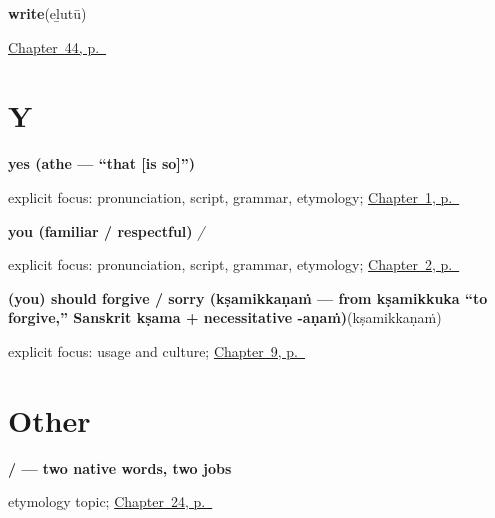 \noindent\begin{minipage}[t]{\linewidth}
\raggedright
\textbf{write}\enspace\emph{}\enspace(eḻutū)\par
\footnotesize \hyperref[ch:ml-see-say]{Chapter~44, p.~\pageref*{ch:ml-see-say}}
\end{minipage}\par\smallskip

\section*{Y}

\noindent\begin{minipage}[t]{\linewidth}
\raggedright
\textbf{yes (athe — \textquotedblleft{}that {[}is so{]}\textquotedblright{})}\enspace\emph{}\par
\footnotesize explicit focus: pronunciation, script, grammar, etymology; \hyperref[ch:greetings]{Chapter~1, p.~\pageref*{ch:greetings}}
\end{minipage}\par\smallskip

\noindent\begin{minipage}[t]{\linewidth}
\raggedright
\textbf{you (familiar / respectful)}\enspace\emph{ / }\par
\footnotesize explicit focus: pronunciation, script, grammar, etymology; \hyperref[ch:introductions]{Chapter~2, p.~\pageref*{ch:introductions}}
\end{minipage}\par\smallskip

\noindent\begin{minipage}[t]{\linewidth}
\raggedright
\textbf{(you) should forgive / sorry (kṣamikkaṇaṁ — from kṣamikkuka \textquotedblleft{}to forgive,\textquotedblright{} Sanskrit kṣama + necessitative -aṇaṁ)}\enspace\emph{}\enspace(kṣamikkaṇaṁ)\par
\footnotesize explicit focus: usage and culture; \hyperref[ch:ml-sorry]{Chapter~9, p.~\pageref*{ch:ml-sorry}}
\end{minipage}\par\smallskip

\section*{Other}

\noindent\begin{minipage}[t]{\linewidth}
\raggedright
\textbf{ /  — two native words, two jobs}\par
\footnotesize etymology topic; \hyperref[ch:ml-night]{Chapter~24, p.~\pageref*{ch:ml-night}}
\end{minipage}\par\smallskip

